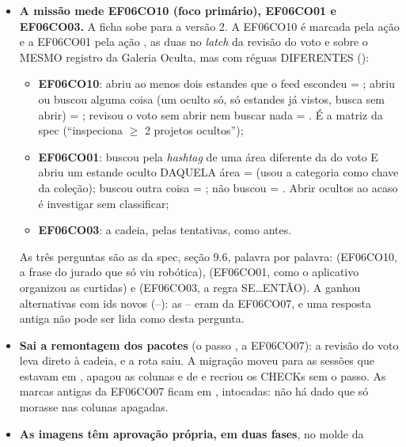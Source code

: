 \begin{itemize}
  \item \textbf{A missão mede EF06CO10 (foco primário), EF06CO01 e EF06CO03.}
    A ficha  sobe para a versão 2.
    A EF06CO10 é marcada pela ação  e a EF06CO01 pela ação
    , as duas no \emph{latch} da revisão do voto e sobre o
    MESMO registro da Galeria Oculta, mas com réguas DIFERENTES
    ():
    \begin{itemize}
      \item \textbf{EF06CO10}: abriu ao menos dois estandes que o feed
        escondeu = ; abriu ou buscou alguma coisa (um oculto só,
        só estandes já vistos, busca sem abrir) = ; revisou o
        voto sem abrir nem buscar nada = . É a matriz da spec
        (\enquote{inspeciona $\geq$ 2 projetos ocultos});
      \item \textbf{EF06CO01}: buscou pela \emph{hashtag} de uma área
        diferente da do voto E abriu um estande oculto DAQUELA área =
         (usou a categoria como chave da coleção); buscou outra
        coisa = ; não buscou = . Abrir
        ocultos ao acaso é investigar sem classificar;
      \item \textbf{EF06CO03}: a cadeia, pelas tentativas, como antes.
    \end{itemize}
    As três perguntas são as da spec, seção 9.6, palavra por palavra:
     (EF06CO10, a frase do jurado que só viu robótica), 
    (EF06CO01, como o aplicativo organizou as curtidas) e  (EF06CO03,
    a regra SE\ldots{}ENTÃO). A  ganhou alternativas com ids novos
    (--): as -- eram da EF06CO07, e uma resposta
    antiga não pode ser lida como desta pergunta.
  \item \textbf{Sai a remontagem dos pacotes} (o passo , a
    EF06CO07): a revisão do voto leva direto à cadeia, e a rota
     saiu. A migração
     moveu
    para  as sessões que estavam em , apagou as colunas
     e  de
     e recriou os CHECKs sem o passo. As marcas antigas
    da EF06CO07 ficam em , intocadas: não há dado que
    só morasse nas colunas apagadas.
  \item \textbf{As imagens têm aprovação própria, em duas fases}, no molde da

\end{itemize}
